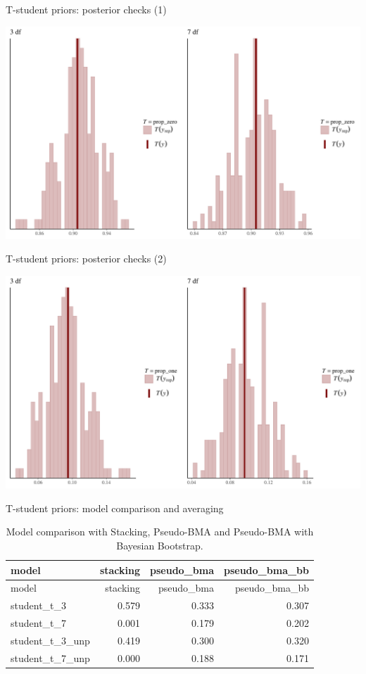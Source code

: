 \documentclass[ignorenonframetext,a4paper]{beamer}
\begin{document}
\begin{frame}{T-student priors: posterior checks (1)}

\includegraphics{DB_presentation_case_study_files/figure-beamer/unnamed-chunk-34-1.pdf}

\end{frame}

\begin{frame}{T-student priors: posterior checks (2)}

\includegraphics{DB_presentation_case_study_files/figure-beamer/unnamed-chunk-35-1.pdf}

\end{frame}

\begin{frame}{T-student priors: model comparison and averaging}

\begin{longtable}[]{@{}lrrr@{}}
\caption{Model comparison with Stacking, Pseudo-BMA and Pseudo-BMA with
Bayesian Bootstrap.}\tabularnewline
\toprule
model & stacking & pseudo\_bma & pseudo\_bma\_bb\tabularnewline
\midrule
\endfirsthead
\toprule
model & stacking & pseudo\_bma & pseudo\_bma\_bb\tabularnewline
\midrule
\endhead
student\_t\_3 & 0.579 & 0.333 & 0.307\tabularnewline
student\_t\_7 & 0.001 & 0.179 & 0.202\tabularnewline
student\_t\_3\_unp & 0.419 & 0.300 & 0.320\tabularnewline
student\_t\_7\_unp & 0.000 & 0.188 & 0.171\tabularnewline
\bottomrule
\end{longtable}

\end{frame}
\end{document}
